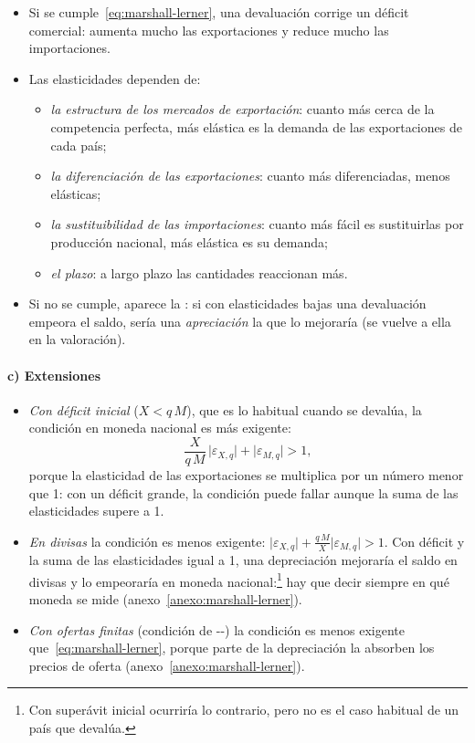 \documentclass[11pt]{article}
\begin{document}
\begin{itemize}
\item Si se cumple~\eqref{eq:marshall-lerner}, una devaluación corrige un déficit comercial: aumenta mucho las exportaciones y reduce mucho las importaciones.
\item Las elasticidades dependen de:
  \begin{itemize}
  \item \emph{la estructura de los mercados de exportación}: cuanto más cerca de la competencia perfecta, más elástica es la demanda de las exportaciones de cada país;
  \item \emph{la diferenciación de las exportaciones}: cuanto más diferenciadas, menos elásticas;
  \item \emph{la sustituibilidad de las importaciones}: cuanto más fácil es sustituirlas por producción nacional, más elástica es su demanda;
  \item \emph{el plazo}: a largo plazo las cantidades reaccionan más.
  \end{itemize}
\item Si no se cumple, aparece la : si con elasticidades bajas una devaluación empeora el saldo, sería una \emph{apreciación} la que lo mejoraría (se vuelve a ella en la valoración).
\end{itemize}

\paragraph{c) Extensiones}

\begin{itemize}
\item \emph{Con déficit inicial} ($X<q\,M$), que es lo habitual cuando se devalúa, la condición en moneda nacional es más exigente:
  \begin{equation}\label{eq:ml-deficit}
  \frac{X}{q\,M}\,\lvert\varepsilon_{X,q}\rvert+\lvert\varepsilon_{M,q}\rvert>1 ,
  \end{equation}
  porque la elasticidad de las exportaciones se multiplica por un número menor que 1: con un déficit grande, la condición puede fallar aunque la suma de las elasticidades supere a 1.
\item \emph{En divisas} la condición es menos exigente: $\lvert\varepsilon_{X,q}\rvert+\frac{q\,M}{X}\lvert\varepsilon_{M,q}\rvert>1$. Con déficit y la suma de las elasticidades igual a 1, una depreciación mejoraría el saldo en divisas y lo empeoraría en moneda nacional:\footnote{Con superávit inicial ocurriría lo contrario, pero no es el caso habitual de un país que devalúa.} hay que decir siempre en qué moneda se mide (anexo~\ref{anexo:marshall-lerner}).
\item \emph{Con ofertas finitas} (condición de --) la condición es menos exigente que~\eqref{eq:marshall-lerner}, porque parte de la depreciación la absorben los precios de oferta (anexo~\ref{anexo:marshall-lerner}).
\end{itemize}
\end{document}
